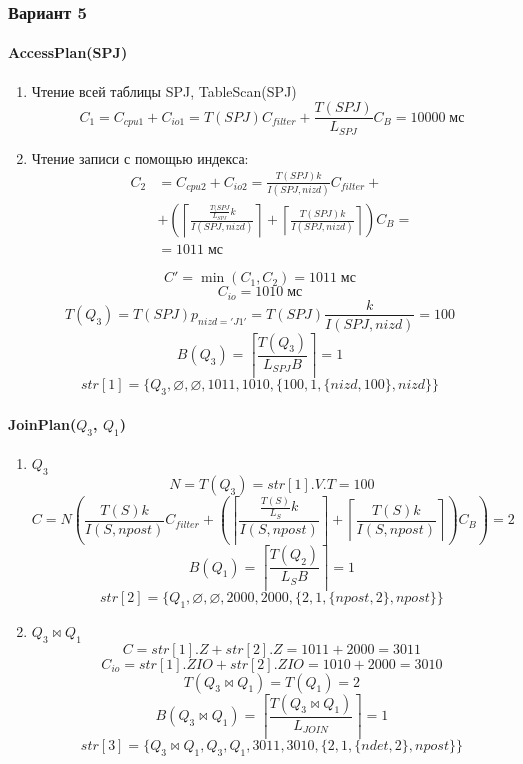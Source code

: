 \documentclass[russian,utf8,emptystyle]{eskdtext}
\begin{document}
\subsubsection{Вариант 5}

\paragraph{AccessPlan(SPJ)}
\begin{enumerate}[label=\arabic*)]
\item Чтение всей таблицы SPJ, TableScan(SPJ)
$$
C_1 = C_{cpu1} + C_{io1} = T(SPJ)C_{filter} + \frac{T(SPJ)}{L_{SPJ}}C_B = 10000 \; \text{мс}
$$
\item Чтение записи с помощью индекса:
\begin{align*}
C_2 &= C_{cpu2} + C_{io2} = \frac{T(SPJ)k}{I(SPJ,nizd)}C_{filter} + \\
& + \left( \left\lceil \frac{\frac{T(SPJ}{L_{SPJ}}k}{I(SPJ,nizd)}\right\rceil + \left\lceil \frac{T(SPJ)k}{I(SPJ,nizd)} \right\rceil \right) C_B = \\
&= 1011 \; \text{мс}
\end{align*}
\end{enumerate}

$$
C' = \min(C_1, C_2) = 1011 \; \text{мс}
$$
$$
C_{io} = 1010 \; \text{мс}
$$
$$
T(Q_3) = T(SPJ)p_{nizd='J1'} = T(SPJ)\frac{k}{I(SPJ,nizd)} = 100
$$
$$
B(Q_3) = \left\lceil \frac{T(Q_3)}{L_{SPJ}B}\right\rceil = 1
$$
$$
str[1] = \{Q_3, \varnothing, \varnothing, 1011, 1010, \{ 100, 1, \{ nizd, 100\}, nizd\}\}
$$

\paragraph{JoinPlan($Q_3$, $Q_1$)}

\begin{enumerate}[label=\arabic*.]
\item $Q_3$
$$
N = T(Q_3) = str[1].V.T = 100
$$
$$
C = N\left(\frac{T(S)k}{I(S,npost)}C_{filter} + \left( \left\lceil \frac{\frac{T(S)}{L_S} k}{I(S, npost)} \right\rceil + \left\lceil \frac{T(S)k}{I(S,npost)}\right\rceil \right)C_B\right) = 2
$$
$$
B(Q_1) = \left\lceil \frac{T(Q_2)}{L_{S}B}\right\rceil = 1
$$
$$
str[2] = \{Q_1, \varnothing, \varnothing, 2000, 2000, \{ 2, 1, \{ npost, 2\}, npost\}\}
$$

\item $Q_3 \bowtie Q_1$
$$
C = str[1].Z + str[2].Z = 1011 + 2000 = 3011
$$
$$
C_{io} = str[1].ZIO + str[2].ZIO = 1010 + 2000 = 3010
$$
$$
T(Q_3 \bowtie Q_1) = T(Q_1) = 2
$$
$$
B(Q_3 \bowtie Q_1) = \left\lceil \frac{T(Q_3 \bowtie Q_1)}{L_{JOIN}}\right\rceil = 1
$$
$$
str[3] = \{Q_3 \bowtie Q_1, Q_3, Q_1, 3011, 3010, \{ 2, 1, \{ ndet, 2\}, npost\}\}
$$
\end{enumerate}
\end{document}
